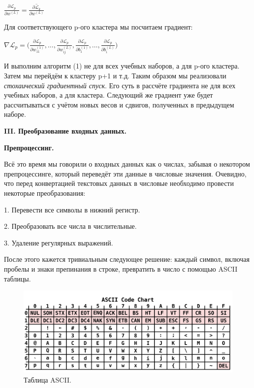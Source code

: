 \documentclass[12pt]{extarticle}
\begin{document}
	\centerline{$\frac{\partial \mathcal{L}_p}{\partial w^{(L)}} = \overline{\frac{\partial  \mathcal{L}_k}{\partial w^{(L)}}}$}
	
	Для соответствующего p-ого кластера мы посчитаем градиент:
	
	\centerline{$\nabla \mathcal{L}_p = \Big(\frac{\partial \mathcal{L}_p}{\partial w_{11}^{(1)}}, \dots, \frac{\partial \mathcal{L}_p}{\partial w_{ij}^{(L)}}, \frac{\partial \mathcal{L}_p}{\partial b_{1}^{(1)}}, \dots, \frac{\partial \mathcal{L}_p}{\partial b_{i}^{(L)}}\Big)$}
	
	И выполним алгоритм (1) не для всех учебных наборов, а для p-ого кластера. Затем мы перейдём к кластеру p+1 и т.д. Таким образом мы реализовали \textit{стохаический градиентный спуск}. Его суть в рассчёте градиента не для всех учебных наборов, а для кластера. Следующий же градиент уже будет рассчитываться с учётом новых весов и сдвигов, полученных в предыдущем наборе. 
	
	\newpage
	
	\centerline{\textbf{III. Преобразование входных данных.}}
	\centerline{\textbf{Препроцессинг.}}
	Всё это время мы говорили о входных данных как о числах, забывая о некотором препроцессинге, который переведёт эти данные в числовые значения. Очевидно, что перед конвертацией текстовых данных в числовые необходимо провести некоторые преобразования:
	
	1. Перевести все символы в нижний регистр. 
	
	2. Преобразовать все числа в числительные. 
	
	3. Удаление регулярных выражений. 
	
	После этого кажется тривиальным следующее решение: каждый символ, включая пробелы и знаки препинания в строке, превратить в число с помощью ASCII таблицы. 
	
	\begin{figure}[h]
			\centering
			\includegraphics[width=0.8\linewidth]{ASCII_Code_Chart.png}
			\caption{Таблица ASCII.}
			\label{fig:mpr}
	\end{figure}
	
\end{document}
